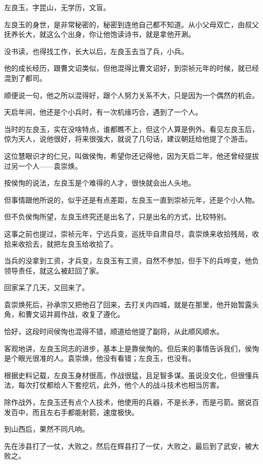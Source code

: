 \begin{multicols}{\theparacolNo}
		左良玉，字昆山，无学历，文盲。

		左良玉的身世，是非常秘密的，秘密到连他自己都不知道。从小父母双亡，由叔父抚养长大，就这么个出身，你让他饱读诗书，就是拿他开涮。

		没书读，也得找工作，长大以后，左良玉去当了兵，小兵。

		他的成长经历，跟曹文诏类似，但他混得比曹文诏好，到崇祯元年的时候，就已经混到了都司。

		顺便说一句，他之所以混得好，跟个人努力关系不大，只是因为一个偶然的机会。

		天启年间，他还是个小兵时，有一次机缘巧合，遇到了一个人。

		当时的左良玉，实在没啥特点，谁都瞧不上，但这个人算是例外。看见左良玉后，惊为天人，说他很好，将来很强大，就说了几句话，建议朝廷给他提了个游击。

		这位慧眼识才的仁兄，叫做侯恂，希望你还记得他，因为天启二年，他还曾经提拔过另一个人——袁崇焕。

		按侯恂的说法，左良玉是个难得的人才，很快就会出人头地。

		但事情跟他所说的，似乎还是有点差距，左良玉一直到崇祯元年，还是个小人物。

		但不负侯恂所望，左良玉终究还是出名了，只是出名的方式，比较特别。

		这事之前也提过，崇祯元年，宁远兵变，巡抚毕自肃自尽，袁崇焕来收拾残局，收拾来收拾去，就把左良玉给收拾了。

		当兵的没拿到工资，才兵变，左良玉有工资，自然不参加，但手下的兵哗变，他负领导责任，就这么被赶回了家。

		回家呆了几天，又回来了。

		袁崇焕死后，孙承宗又把他召了回来，去打关内四城，就是在那里，他开始暂露头角，和曹文诏并肩作战，收复了遵化。

		恰好，这段时间侯恂也混得不错，顺道给他提了副将，从此顺风顺水。

		客观地讲，左良玉同志的进步，基本上是靠侯恂的。但后来的事情告诉我们，侯恂是个眼光很准的人。袁崇焕，他没有看错；左良玉，也没有。

		根据史料记载，左良玉身材很高，作战很猛，且足智多谋。虽说没文化，但很懂兵法，每次打仗都给人下套挖坑，此外，他个人的战斗技术也相当厉害。

		除作战外，左良玉还有点个人技术，他使用的兵器，不是长矛，而是弓箭。据说百发百中，而且左右手都能射箭，速度极快。

		到山西后，果然不同凡响。

		先在涉县打了一仗，大败之，然后在辉县打了一仗，大败之，最后到了武安，被大败之。


\end{multicols}
